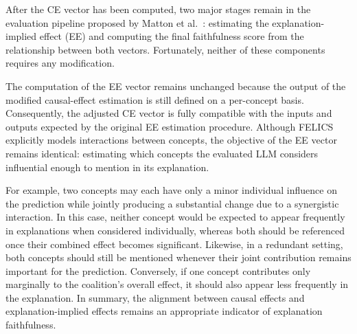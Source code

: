 After the CE vector has been computed, two major stages remain in the evaluation pipeline proposed by Matton et al.~\cite{mattonWalkTalkMeasuring2024}: estimating the explanation-implied effect (EE) and computing the final faithfulness score from the relationship between both vectors. Fortunately, neither of these components requires any modification.

The computation of the EE vector remains unchanged because the output of the modified causal-effect estimation is still defined on a per-concept basis. Consequently, the adjusted CE vector is fully compatible with the inputs and outputs expected by the original EE estimation procedure. Although FELICS explicitly models interactions between concepts, the objective of the EE vector remains identical: estimating which concepts the evaluated LLM considers influential enough to mention in its explanation.

For example, two concepts may each have only a minor individual influence on the prediction while jointly producing a substantial change due to a synergistic interaction. In this case, neither concept would be expected to appear frequently in explanations when considered individually, whereas both should be referenced once their combined effect becomes significant. Likewise, in a redundant setting, both concepts should still be mentioned whenever their joint contribution remains important for the prediction. Conversely, if one concept contributes only marginally to the coalition's overall effect, it should also appear less frequently in the explanation. In summary, the alignment between causal effects and explanation-implied effects remains an appropriate indicator of explanation faithfulness.


